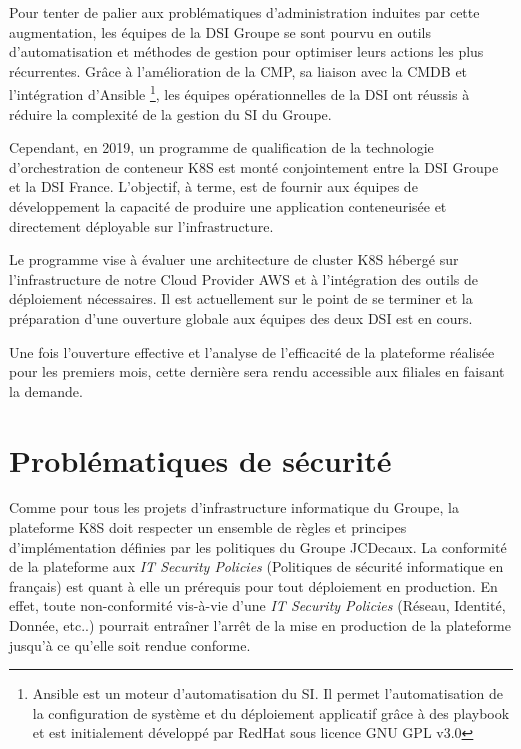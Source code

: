 Pour tenter de palier aux problématiques d'administration induites par cette augmentation, les équipes de la \ac{DSI} 
Groupe se sont pourvu en outils d'automatisation et méthodes de gestion pour optimiser leurs actions les plus récurrentes.
Grâce à l'amélioration de la \ac{CMP}, sa liaison avec la \ac{CMDB} et l'intégration d'Ansible \footnote{Ansible est un 
moteur d'automatisation du SI. Il permet l'automatisation de la configuration de système et du déploiement applicatif
grâce à des playbook et est initialement développé par RedHat sous licence GNU GPL v3.0}, les équipes opérationnelles 
de la DSI ont réussis à réduire la complexité de la gestion du \ac{SI} du Groupe.

Cependant, en 2019, un programme de qualification de la technologie d'orchestration de conteneur \ac{K8S} est monté 
conjointement entre la \ac{DSI} Groupe et la \ac{DSI} France. L'objectif, à terme, est de fournir aux équipes de 
développement la capacité de produire une application conteneurisée et directement déployable sur l'infrastructure.

Le programme vise à évaluer une architecture de cluster \ac{K8S} hébergé sur l'infrastructure de notre Cloud 
Provider \ac{AWS} et à l'intégration des outils de déploiement nécessaires. Il est actuellement sur le point de se 
terminer et la préparation d'une ouverture globale aux équipes des deux \ac{DSI} est en cours.

Une fois l'ouverture effective et l'analyse de l'efficacité de la plateforme réalisée pour les premiers mois, cette 
dernière sera rendu accessible aux filiales en faisant la demande.

\section{Problématiques de sécurité}
Comme pour tous les projets d'infrastructure informatique du Groupe, la plateforme \ac{K8S} doit respecter un ensemble de
règles et principes d'implémentation définies par les politiques du Groupe JCDecaux. La conformité de la plateforme aux
\emph{IT Security Policies} (\ie Politiques de sécurité informatique en français) est quant à elle un prérequis pour tout
déploiement en production. 
\newline En effet, toute non-conformité vis-à-vie d'une \emph{IT Security Policies} (\eg Réseau, Identité, Donnée, etc..)
pourrait entraîner l'arrêt de la mise en production de la plateforme jusqu'à ce qu'elle soit rendue conforme.

